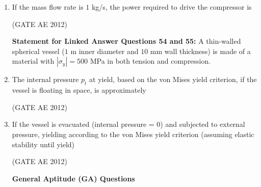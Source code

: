 \documentclass[journal,12pt,onecolumn]{IEEEtran}
\theoremstyle{remark}
\begin{document}
\begin{enumerate}
\item If the mass flow rate is $1$ kg/s, the power required to drive the compressor is
\begin{enumerate}
\end{enumerate}
\hfill(GATE AE 2012)



\textbf{Statement for Linked Answer Questions 54 and 55:}
A thin-walled spherical vessel ($1$ m inner diameter and $10$ mm wall thickness) is made of a material with $|\sigma_y| = 500$ MPa in both tension and compression.

\item The internal pressure $p_t$ at yield, based on the von Mises yield criterion, if the vessel is floating in space, is approximately
\begin{enumerate}
\end{enumerate}
\hfill(GATE AE 2012)



\item If the vessel is evacuated (internal pressure = 0) and subjected to external pressure, yielding according to the von Mises yield criterion (assuming elastic stability until yield)
\begin{enumerate}
\end{enumerate}
\hfill(GATE AE 2012)



\textbf{General Aptitude (GA) Questions}


\end{enumerate}
\end{document}
